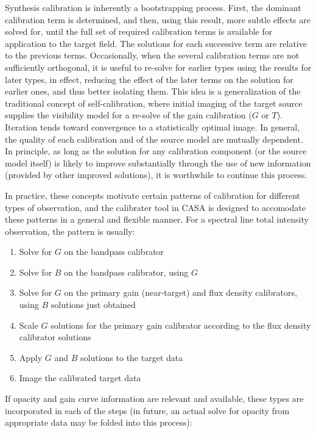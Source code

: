 Synthesis calibration is inherently a bootstrapping process. First,
the dominant calibration term is determined, and then, using this
result, more subtle effects are solved for, until the full set of
required calibration terms is available for application to the target
field. The solutions for each successive term are relative to the
previous terms. Occasionally, when the several calibration terms are
not sufficiently orthogonal, it is useful to re-solve for earlier
types using the results for later types, in effect, reducing the
effect of the later terms on the solution for earlier ones, and thus
better isolating them. This idea is a generalization of the
traditional concept of self-calibration, where initial imaging of the
target source supplies the visibility model for a re-solve of the gain
calibration ($G$ or $T$). Iteration tends toward convergence to a
statistically optimal image. In general, the quality of each
calibration and of the source model are mutually dependent. In
principle, as long as the solution for any calibration component (or
the source model itself) is likely to improve substantially through
the use of new information (provided by other improved solutions), it
is worthwhile to continue this process. 

In practice, these concepts motivate certain patterns of calibration
for different types of observation, and the calibrater tool in CASA is
designed to accomodate these patterns in a general and flexible
manner. For a spectral line total intensity observation, the pattern
is usually: 

\begin{enumerate}
   \item Solve for $G$ on the bandpass calibrator
   \item Solve for $B$ on the bandpass calibrator, using $G$
   \item Solve for $G$ on the primary gain (near-target) and flux
      density calibrators, using $B$ solutions just obtained 
   \item Scale $G$ solutions for the primary gain calibrator according to
      the flux density calibrator solutions 
   \item Apply $G$ and $B$ solutions to the target data
   \item Image the calibrated target data 
\end{enumerate}

If opacity and gain curve information are relevant and available,
these types are incorporated in each of the steps (in future, an
actual solve for opacity from appropriate data may be folded into this
process): 
 
